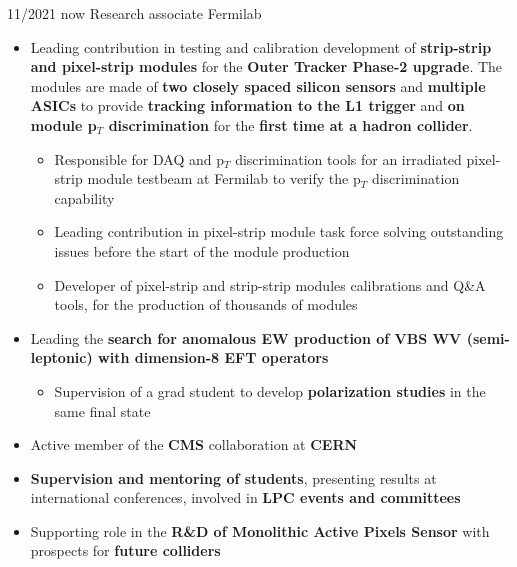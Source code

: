   \position
  {11/2021  \textemdash{} now} 
   {Research associate}
   {Fermilab}
{\begin{itemize}

\item Leading contribution in testing and calibration development of {\bf strip-strip and pixel-strip modules} for the {\bf Outer Tracker Phase-2 upgrade}. The modules are made of {\bf two closely spaced silicon sensors} and {\bf multiple ASICs} to provide {\bf tracking information to the L1 trigger} and {\bf on module p$_{T}$ discrimination} for the {\bf first time at a hadron collider}.
\begin{itemize}
\item Responsible for DAQ and p$_{T}$ discrimination tools for an irradiated pixel-strip module testbeam at Fermilab to verify the p$_{T}$ discrimination capability
\item Leading contribution in pixel-strip module task force solving outstanding issues before the start of the module production
\item Developer of pixel-strip and strip-strip modules calibrations and Q\&A tools, for the production of thousands of modules
\end{itemize}
\item Leading the {\bf search for anomalous EW production of VBS WV (semi-leptonic) with dimension-8 EFT operators}
\begin{itemize}
\item Supervision of a grad student to develop {\bf polarization studies} in the same final state
\end{itemize}
\item Active member of the {\bf CMS} collaboration at {\bf CERN}
\item {\bf Supervision and mentoring of students}, presenting results at international conferences,  involved in {\bf LPC events and committees}
\item Supporting role in the {\bf R\&D of Monolithic Active Pixels Sensor} with prospects for {\bf future colliders}
\end{itemize}
}

